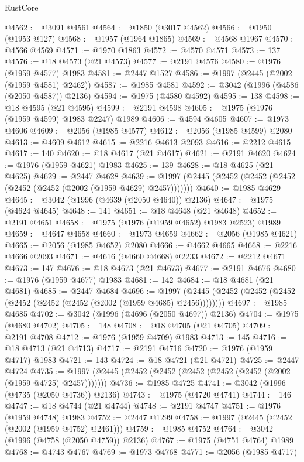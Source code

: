 \begin{lexlean}{RustCore}
\begin{coremodule}
@4562 := @3091 @4561
@4564 := @1850 (@3017 @4562)
@4566 := @1950 (@1953 @127)
@4568 := @1957 (@1964 @1865)
@4569 := @4568 @1967
@4570 := @4566 @4569
@4571 := @1970 @1863
@4572 := @4570 @4571
@4573 := 137
@4576 := @18 @4573 (@21 @4573)
@4577 := @2191 @4576
@4580 := @1976 (@1959 @4577) @1983
@4581 := @2447 @1527
@4586 := @1997 (@2445 (@2002 (@1959 @4581) @2462))
@4587 := @1985 @4581
@4592 := @3042 (@1996 (@4586 (@2050 @4587)) @2136)
@4594 := @1975 (@4580 @4592)
@4595 := 138
@4598 := @18 @4595 (@21 @4595)
@4599 := @2191 @4598
@4605 := @1975 (@1976 (@1959 @4599) @1983 @2247) @1989
@4606 := @4594 @4605
@4607 := @1973 @4606
@4609 := @2056 (@1985 @4577)
@4612 := @2056 (@1985 @4599) @2080
@4613 := @4609 @4612
@4615 := @2216 @4613 @2093
@4616 := @2212 @4615
@4617 := 140
@4620 := @18 @4617 (@21 @4617)
@4621 := @2191 @4620
@4624 := @1976 (@1959 @4621) @1983
@4625 := 139
@4628 := @18 @4625 (@21 @4625)
@4629 := @2447 @4628
@4639 := @1997 (@2445 (@2452 (@2452 (@2452 (@2452 (@2452 (@2002 (@1959 @4629) @2457)))))))
@4640 := @1985 @4629
@4645 := @3042 (@1996 (@4639 (@2050 @4640)) @2136)
@4647 := @1975 (@4624 @4645)
@4648 := 141
@4651 := @18 @4648 (@21 @4648)
@4652 := @2191 @4651
@4658 := @1975 (@1976 (@1959 @4652) @1983 @2523) @1989
@4659 := @4647 @4658
@4660 := @1973 @4659
@4662 := @2056 (@1985 @4621)
@4665 := @2056 (@1985 @4652) @2080
@4666 := @4662 @4665
@4668 := @2216 @4666 @2093
@4671 := @4616 (@4660 @4668) @2233
@4672 := @2212 @4671
@4673 := 147
@4676 := @18 @4673 (@21 @4673)
@4677 := @2191 @4676
@4680 := @1976 (@1959 @4677) @1983
@4681 := 142
@4684 := @18 @4681 (@21 @4681)
@4685 := @2447 @4684
@4696 := @1997 (@2445 (@2452 (@2452 (@2452 (@2452 (@2452 (@2452 (@2002 (@1959 @4685) @2456))))))))
@4697 := @1985 @4685
@4702 := @3042 (@1996 (@4696 (@2050 @4697)) @2136)
@4704 := @1975 (@4680 @4702)
@4705 := 148
@4708 := @18 @4705 (@21 @4705)
@4709 := @2191 @4708
@4712 := @1976 (@1959 @4709) @1983
@4713 := 145
@4716 := @18 @4713 (@21 @4713)
@4717 := @2191 @4716
@4720 := @1976 (@1959 @4717) @1983
@4721 := 143
@4724 := @18 @4721 (@21 @4721)
@4725 := @2447 @4724
@4735 := @1997 (@2445 (@2452 (@2452 (@2452 (@2452 (@2452 (@2002 (@1959 @4725) @2457)))))))
@4736 := @1985 @4725
@4741 := @3042 (@1996 (@4735 (@2050 @4736)) @2136)
@4743 := @1975 (@4720 @4741)
@4744 := 146
@4747 := @18 @4744 (@21 @4744)
@4748 := @2191 @4747
@4751 := @1976 (@1959 @4748) @1983
@4752 := @2447 @1299
@4758 := @1997 (@2445 (@2452 (@2002 (@1959 @4752) @2461)))
@4759 := @1985 @4752
@4764 := @3042 (@1996 (@4758 (@2050 @4759)) @2136)
@4767 := @1975 (@4751 @4764) @1989
@4768 := @4743 @4767
@4769 := @1973 @4768
@4771 := @2056 (@1985 @4717)

\end{coremodule}
\end{lexlean}
